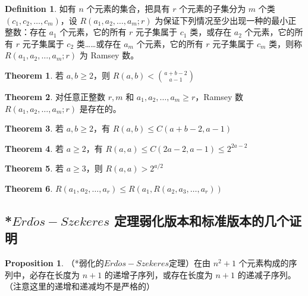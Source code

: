 \documentclass[oneside]{book}
\theoremstyle{definition}
\newtheorem{proposition}{Proposition}[section]
\newtheorem{definition}{Definition}[section]
\newtheorem{theorem}{Theorem}[section]
\begin{document}
	\begin{definition}
		如有 \( n \) 个元素的集合，把具有 \( r \) 个元素的子集分为 \( m \) 个类 \((c_1, c_2, \ldots, c_m)\)，设 \( R(a_1, a_2, \ldots, a_m; r) \) 为保证下列情况至少出现一种的最小正整数：存在 \( a_1 \) 个元素，它的所有 \( r \) 元子集属于 \( c_1 \) 类，或存在 \( a_2 \) 个元素，它的所有 \( r \) 元子集属于 \( c_2 \) 类……或存在 \( a_m \) 个元素，它的所有 \( r \) 元子集属于 \( c_m \) 类，则称 \( R(a_1, a_2, \ldots, a_m; r) \) 为 Ramsey 数。
	\end{definition}
	\begin{theorem}
		若 \( a, b \geq 2 \)，则 \( R(a, b) < \binom{a + b - 2}{a - 1} \)
	\end{theorem}
	\begin{theorem}
		对任意正整数 $r,m$ 和 $a_1, a_2, \ldots, a_m \geq r$，Ramsey 数 $R(a_1, a_2, \ldots, a_m; r)$ 是存在的。
	\end{theorem}
	\begin{theorem}
	若 \( a, b \geq 2 \)，有 \( R(a, b) \leq C(a + b - 2, a - 1) \)
\end{theorem}
	\begin{theorem}
	若 \( a \geq 2 \)，有 \( R(a, a) \leq C(2a - 2, a - 1) \leq 2^{2a - 2} \)
\end{theorem}
	\begin{theorem}
	若 \( a \geq 3 \)，则 \( R(a, a) > 2^{a/2} \)
\end{theorem}
	\begin{theorem}
	\( R(a_1, a_2, \ldots, a_r) \leq R(a_1, R(a_2, a_3, \ldots, a_r)) \)
\end{theorem}
	
	
	
	\subsection{*$Erd\ddot{o}s-Szekeres$ 定理弱化版本和标准版本的几个证明}
	\begin{proposition}
		（*弱化的$Erd\ddot{o}s-Szekeres$定理）在由 \( n^2 + 1 \) 个元素构成的序列中，必存在长度为 \( n + 1 \) 的递增子序列，或存在长度为 \( n + 1 \) 的递减子序列。（注意这里的递增和递减均不是严格的）
	\end{proposition}
	
\end{document}

